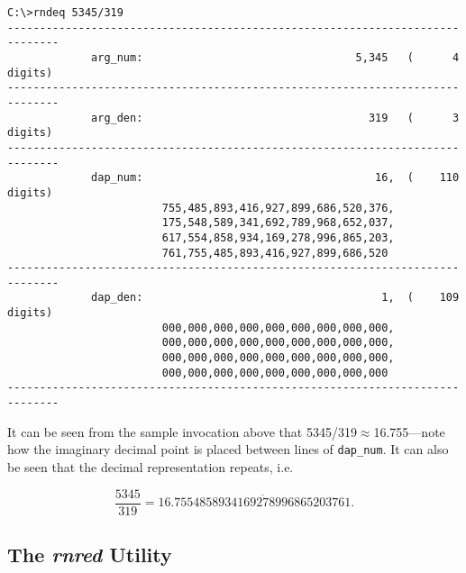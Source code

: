 \begin{dosutilcommandsampleinvocations}
\begin{scriptsize}
\begin{verbatim}
C:\>rndeq 5345/319
------------------------------------------------------------------------------
             arg_num:                                 5,345   (      4 digits)
------------------------------------------------------------------------------
             arg_den:                                   319   (      3 digits)
------------------------------------------------------------------------------
             dap_num:                                    16,  (    110 digits)
                        755,485,893,416,927,899,686,520,376,
                        175,548,589,341,692,789,968,652,037,
                        617,554,858,934,169,278,996,865,203,
                        761,755,485,893,416,927,899,686,520
------------------------------------------------------------------------------
             dap_den:                                     1,  (    109 digits)
                        000,000,000,000,000,000,000,000,000,
                        000,000,000,000,000,000,000,000,000,
                        000,000,000,000,000,000,000,000,000,
                        000,000,000,000,000,000,000,000,000
------------------------------------------------------------------------------
\end{verbatim}
\end{scriptsize}

It can be seen from the sample invocation above that 
5345/319$\approx$16.755---note how the imaginary decimal point is placed
between lines of \texttt{dap\_num}.  It can also be seen that the
decimal representation repeats, i.e.

\begin{equation}
\frac{5345}{319} = 16.\overline{7554858934169278996865203761}.
\end{equation}
\end{dosutilcommandsampleinvocations}


\subsection{The \emph{rnred} Utility}
\label{cdcm0:srnu0:srnr0}

